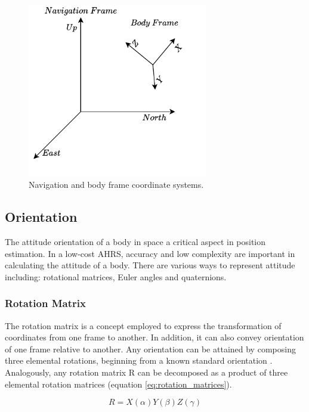 \begin{figure}[!h]
    \centering
    \includegraphics[width=0.7\textwidth]{figures/body_frame.pdf}
    \caption{ Navigation and body frame coordinate systems. }
    \label{fig:body_frame}
\end{figure}

\newpage
\subsection{Orientation}
\label{sub:orientation}

The attitude orientation of a body in space a critical aspect in position estimation. In a low-cost AHRS, accuracy and low complexity are important in calculating the attitude of a body. There are various ways to represent attitude including: rotational matrices, Euler angles and quaternions.

\subsubsection{Rotation Matrix}

The rotation matrix is a concept employed to express the transformation of coordinates from one frame to another. In addition, it can also convey orientation of one frame relative to another. Any orientation can be attained by composing three elemental rotations, beginning from a known standard orientation \cite{huynh2009metrics}. Analogously, any rotation matrix R can be decomposed as a product of three elemental rotation matrices (equation \ref{eq:rotation_matrices}).

\begin{equation}
    R = X(\alpha)Y(\beta)Z(\gamma)
    \label{eq:rotation_matrices}
\end{equation}


